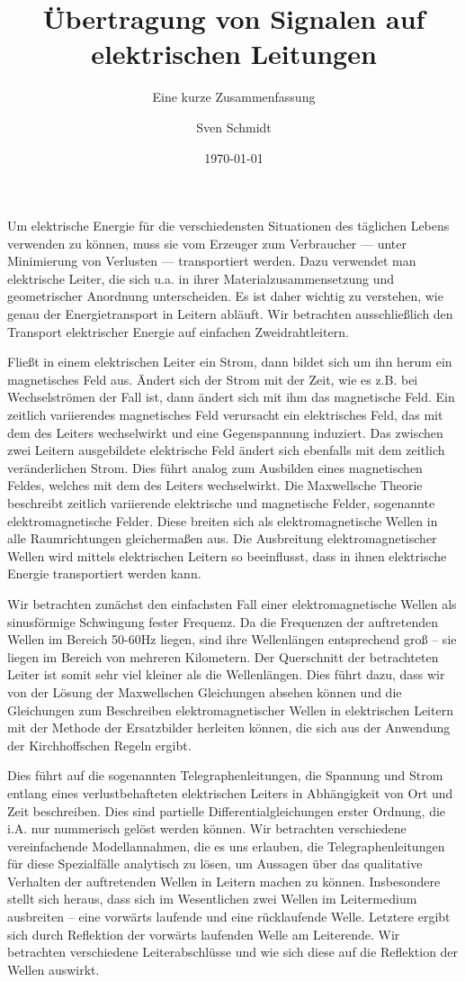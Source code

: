 \documentclass[12pt,ngerman,parkskip=half-]{scrreprt}
\title{Übertragung von Signalen auf elektrischen Leitungen}
\subtitle{Eine kurze Zusammenfassung}
\author{Sven Schmidt}
\date{\today}
\begin{document}
\maketitle

Um elektrische Energie für die verschiedensten Situationen des täglichen Lebens verwenden zu können, muss sie vom Erzeuger zum Verbraucher --- unter Minimierung von Verlusten --- transportiert werden. Dazu verwendet man elektrische Leiter, die sich u.a. in ihrer Materialzusammensetzung und geometrischer Anordnung unterscheiden. Es ist daher wichtig zu verstehen, wie genau der Energietransport in Leitern abläuft. Wir betrachten ausschließlich den Transport elektrischer Energie auf einfachen Zweidrahtleitern.

Fließt in einem elektrischen Leiter ein Strom, dann bildet sich um ihn herum ein magnetisches Feld aus. Ändert sich der Strom mit der Zeit, wie es z.B. bei Wechselströmen der Fall ist, dann ändert sich mit ihm das magnetische Feld. Ein zeitlich variierendes magnetisches Feld verursacht ein elektrisches Feld, das mit dem des Leiters wechselwirkt und eine  Gegenspannung induziert. Das zwischen zwei Leitern ausgebildete elektrische Feld ändert sich ebenfalls mit dem zeitlich veränderlichen Strom. Dies führt analog zum Ausbilden eines magnetischen Feldes, welches mit dem des Leiters wechselwirkt. Die Maxwellsche Theorie beschreibt zeitlich variierende elektrische und magnetische Felder, sogenannte elektromagnetische Felder. Diese breiten sich als elektromagnetische Wellen in alle Raumrichtungen gleichermaßen aus.  Die Ausbreitung elektromagnetischer Wellen wird mittels elektrischen Leitern so beeinflusst, dass in ihnen elektrische Energie transportiert werden kann.

Wir betrachten zunächst den einfachsten Fall einer elektromagnetische Wellen als sinusförmige Schwingung fester Frequenz. Da die Frequenzen der auftretenden Wellen im Bereich 50-60Hz liegen, sind ihre Wellenlängen entsprechend groß -- sie liegen im Bereich von mehreren Kilometern. Der Querschnitt der betrachteten Leiter ist somit sehr viel kleiner als die Wellenlängen. Dies führt dazu, dass wir von der Lösung der Maxwellschen Gleichungen absehen können und die Gleichungen zum Beschreiben elektromagnetischer Wellen in elektrischen Leitern mit der Methode der Ersatzbilder herleiten können, die sich aus der Anwendung der Kirchhoffschen Regeln ergibt.

Dies führt auf die sogenannten Telegraphenleitungen, die Spannung und Strom entlang eines verlustbehafteten elektrischen Leiters in Abhängigkeit von Ort und Zeit beschreiben. Dies sind partielle Differentialgleichungen erster Ordnung, die i.A. nur nummerisch gelöst werden können. Wir betrachten verschiedene vereinfachende Modellannahmen, die es uns erlauben, die Telegraphenleitungen für diese Spezialfälle analytisch zu lösen, um Aussagen über das qualitative Verhalten der auftretenden Wellen in Leitern machen zu können. Insbesondere stellt sich heraus, dass sich im Wesentlichen zwei Wellen im Leitermedium ausbreiten -- eine vorwärts laufende und eine rücklaufende Welle. Letztere ergibt sich durch Reflektion der vorwärts laufenden Welle am Leiterende. Wir betrachten verschiedene Leiterabschlüsse und wie sich diese auf die Reflektion der Wellen auswirkt.
\end{document}
